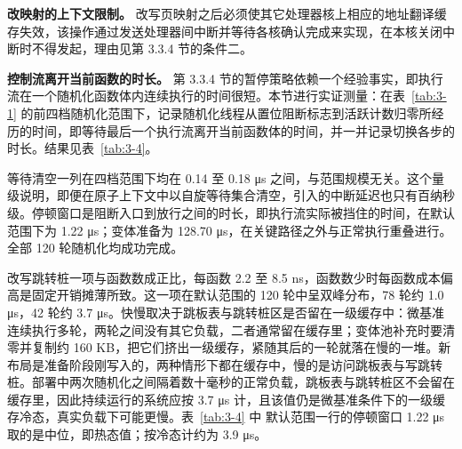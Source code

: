 \textbf{改映射的上下文限制。} 改写页映射之后必须使其它处理器核上相应的地址翻译缓存失效，该操作通过发送处理器间中断并等待各核确认完成来实现，在本核关闭中断时不得发起，理由见第 3.3.4 节的条件二。

\textbf{控制流离开当前函数的时长。} 第 3.3.4 节的暂停策略依赖一个经验事实，即执行流在一个随机化函数体内连续执行的时间很短。本节进行实证测量：在表~\ref{tab:3-1} 的前四档随机化范围下，记录随机化线程从置位阻断标志到活跃计数归零所经历的时间，即等待最后一个执行流离开当前函数体的时间，并一并记录切换各步的时长。结果见表~\ref{tab:3-4}。

\begin{table}[!htbp]
    \label{tab:3-4}
    \centering
    \scriptsize
    \setlength{\tabcolsep}{3pt}
    \renewcommand{\arraystretch}{1.25}
\end{table}

等待清空一列在四档范围下均在 0.14 至 0.18 μs 之间，与范围规模无关。这个量级说明，即便在原子上下文中以自旋等待集合清空，引入的中断延迟也只有百纳秒级。停顿窗口是阻断入口到放行之间的时长，即执行流实际被挡住的时间，在默认范围下为 1.22 μs；变体准备为 128.70 μs，在关键路径之外与正常执行重叠进行。全部 120 轮随机化均成功完成。

改写跳转桩一项与函数数成正比，每函数 2.2 至 8.5 ns，函数数少时每函数成本偏高是固定开销摊薄所致。这一项在默认范围的 120 轮中呈双峰分布，78 轮约 1.0 μs，42 轮约 3.7 μs。快慢取决于跳板表与跳转桩区是否留在一级缓存中：微基准连续执行多轮，两轮之间没有其它负载，二者通常留在缓存里；变体池补充时要清零并复制约 160 KB，把它们挤出一级缓存，紧随其后的一轮就落在慢的一堆。新布局是准备阶段刚写入的，两种情形下都在缓存中，慢的是访问跳板表与写跳转桩。部署中两次随机化之间隔着数十毫秒的正常负载，跳板表与跳转桩区不会留在缓存里，因此持续运行的系统应按 3.7 μs 计，且该值仍是微基准条件下的一级缓存冷态，真实负载下可能更慢。表~\ref{tab:3-4} 中 默认范围一行的停顿窗口 1.22 μs 取的是中位，即热态值；按冷态计约为 3.9 μs。

